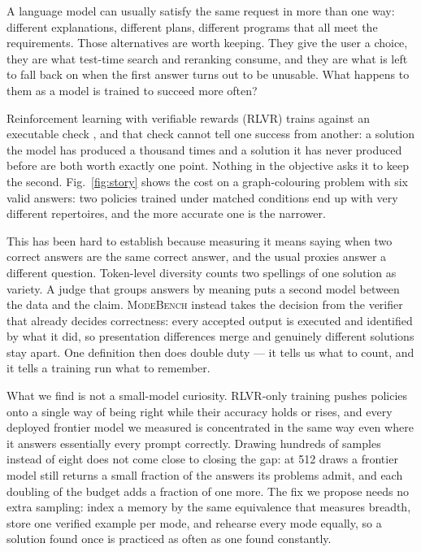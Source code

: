 \documentclass{article}
\newcommand{\1}{\mathbf 1}
\newcommand{\mb}{\textsc{ModeBench}}
\theoremstyle{remark}
\theoremstyle{definition}
\theoremstyle{plain}
\begin{document}
A language model can usually satisfy the same request in more than one way:
different explanations, different plans, different programs that all meet the
requirements. Those alternatives are worth keeping. They give the user a choice,
they are what test-time search and reranking consume, and they are what is left
to fall back on when the first answer turns out to be unusable. What happens to
them as a model is trained to succeed more often?

Reinforcement learning with verifiable rewards (RLVR) trains against an
executable check \citep{guo2025deepseekr1}, and that check cannot tell one
success from another: a solution the model has produced a thousand times and a
solution it has never produced before are both worth exactly one point. Nothing
in the objective asks it to keep the second. Fig.~\ref{fig:story} shows the cost
on a graph-colouring problem with six valid answers: two policies trained under
matched conditions end up with very different repertoires, and the more accurate
one is the narrower.

This has been hard to establish because measuring it means saying when two
correct answers are the same correct answer, and the usual proxies answer a
different question. Token-level diversity counts two spellings of one solution
as variety. A judge that groups answers by meaning puts a second model between
the data and the claim. \mb{} instead takes the decision from the verifier that
already decides correctness: every accepted output is executed and identified by
what it did, so presentation differences merge and genuinely different
solutions stay apart. One definition then does double duty --- it tells us what
to count, and it tells a training run what to remember.

What we find is not a small-model curiosity. RLVR-only training pushes
policies onto a single way of being right while their accuracy holds or rises,
and every deployed frontier model we measured is concentrated in the same way
even where it answers essentially every prompt correctly. Drawing hundreds of
samples instead of eight does not come close to closing the gap: at 512 draws a
frontier model still returns a small fraction of the answers its problems
admit, and each doubling of the budget adds a fraction of one more. The fix we
propose needs no extra sampling: index a memory by the same equivalence that
measures breadth, store one verified example per mode, and rehearse every mode
equally, so a solution found once is practiced as often as one found constantly.
\end{document}

